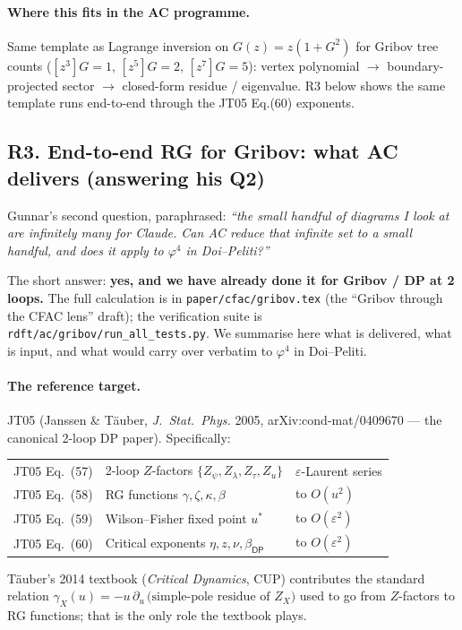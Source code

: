 \documentclass[11pt,a4paper]{article}
\begin{document}
\paragraph{Where this fits in the AC programme.} Same template as Lagrange inversion on $G(z) = z(1+G^2)$ for Gribov tree counts ($[z^3]G=1,\,[z^5]G=2,\,[z^7]G=5$): vertex polynomial $\to$ boundary-projected sector $\to$ closed-form residue / eigenvalue. R3 below shows the same template runs end-to-end through the JT05 Eq.(60) exponents.

\subsection*{R3. End-to-end RG for Gribov: what AC delivers (answering his Q2)}

Gunnar's second question, paraphrased: \emph{``the small handful of diagrams I look at are infinitely many for Claude. Can AC reduce that infinite set to a small handful, and does it apply to $\varphi^4$ in Doi--Peliti?''}

The short answer: \textbf{yes, and we have already done it for Gribov / DP at 2 loops.} The full calculation is in \texttt{paper/cfac/gribov.tex} (the ``Gribov through the CFAC lens'' draft); the verification suite is \texttt{rdft/ac/gribov/run\_all\_tests.py}. We summarise here what is delivered, what is input, and what would carry over verbatim to $\varphi^4$ in Doi--Peliti.

\paragraph{The reference target.} JT05 (Janssen \& T\"auber, \emph{J.\ Stat.\ Phys.} 2005, arXiv:cond-mat/0409670 --- the canonical 2-loop DP paper). Specifically:
\begin{center}\small
\begin{tabular}{@{}lll@{}}
\toprule
JT05 Eq.~(57) & 2-loop $Z$-factors $\{Z_\psi, Z_\lambda, Z_\tau, Z_u\}$ & $\varepsilon$-Laurent series\\
JT05 Eq.~(58) & RG functions $\gamma, \zeta, \kappa, \beta$ & to $O(u^2)$\\
JT05 Eq.~(59) & Wilson--Fisher fixed point $u^*$ & to $O(\varepsilon^2)$\\
JT05 Eq.~(60) & Critical exponents $\eta, z, \nu, \beta_{\textsf{DP}}$ & to $O(\varepsilon^2)$\\
\bottomrule
\end{tabular}
\end{center}
T\"auber's 2014 textbook (\emph{Critical Dynamics}, CUP) contributes the standard relation $\gamma_X(u) = -u\,\partial_u\,\bigl(\text{simple-pole residue of }Z_X\bigr)$ used to go from $Z$-factors to RG functions; that is the only role the textbook plays.
\end{document}
